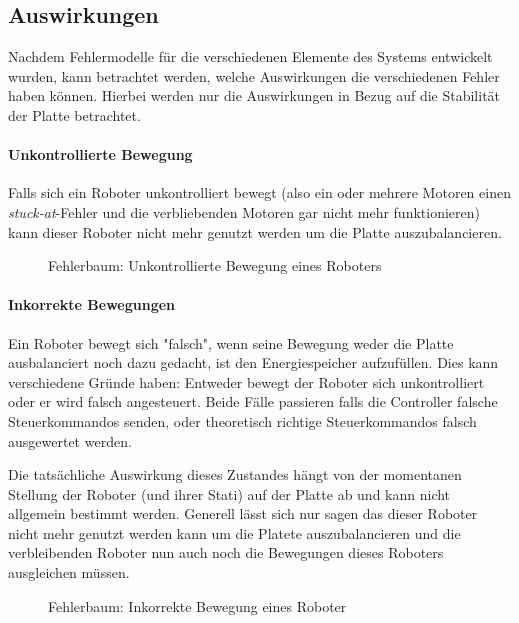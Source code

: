 \subsection{Auswirkungen}
Nachdem Fehlermodelle f{\"{u}}r die verschiedenen Elemente des Systems entwickelt wurden, kann
betrachtet werden, welche Auswirkungen die verschiedenen Fehler haben k{\"{o}}nnen. Hierbei werden nur
die Auswirkungen in Bezug auf die Stabilit{\"{a}}t der Platte betrachtet.

\paragraph{Unkontrollierte Bewegung} Falls sich ein Roboter unkontrolliert bewegt (also ein oder
mehrere Motoren einen \textit{stuck-at}-Fehler und die verbliebenden Motoren gar nicht mehr funktionieren)
kann dieser Roboter nicht mehr genutzt werden um die Platte auszubalancieren.
\begin{figure}
	\centering
	\caption{Fehlerbaum: Unkontrollierte Bewegung eines Roboters}
	\label{fig:fault-tree-robot}
\end{figure}
\clearpage

\paragraph{Inkorrekte Bewegungen} Ein Roboter bewegt sich "falsch", wenn seine Bewegung weder die Platte 
ausbalanciert noch dazu gedacht, ist den Energiespeicher aufzuf{\"{u}}llen. Dies kann verschiedene Gr{\"{u}}nde 
haben: Entweder bewegt der Roboter sich unkontrolliert oder er wird falsch angesteuert. Beide F{\"{a}}lle
passieren falls die Controller falsche Steuerkommandos senden, oder theoretisch richtige Steuerkommandos
falsch ausgewertet werden.

Die tats{\"{a}}chliche Auswirkung dieses Zustandes h{\"{a}}ngt von der momentanen Stellung der Roboter (und ihrer
Stati) auf der Platte ab und kann nicht allgemein bestimmt werden. Generell l{\"{a}}sst sich nur sagen das dieser
Roboter nicht mehr genutzt werden kann um die Platete auszubalancieren und die verbleibenden Roboter nun auch noch
die Bewegungen dieses Roboters ausgleichen m{\"{u}}ssen.

\begin{figure}
	\centering
	\caption{Fehlerbaum: Inkorrekte Bewegung eines Roboter}
	\label{fig:fault-tree-robot2}
\end{figure}


